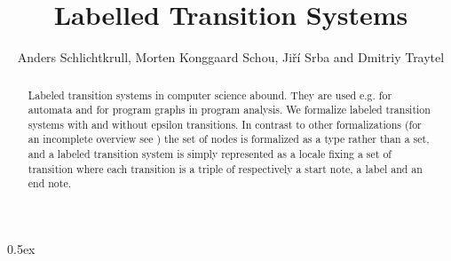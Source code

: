 \documentclass[10pt,a4paper]{article}
\begin{document}
\title{Labelled Transition Systems}
\author{Anders Schlichtkrull, Morten Konggaard Schou, Ji\v{r}\'i Srba and Dmitriy Traytel}
\date{}

\maketitle

\begin{abstract}
\noindent
Labeled transition systems in computer science abound. They are used e.g. for automata and for program graphs in program analysis.
We formalize labeled transition systems with and without epsilon transitions.
In contrast to other formalizations (for an incomplete overview see \cite{graphs}) the set of nodes is formalized as a type rather than a set,
and a labeled transition system is simply represented as a locale fixing a set of transition where each transition is a triple of respectively a start note, a label and an end note.

\end{abstract}

\tableofcontents

\newpage

\parindent 0pt
\parskip 0.5ex

\newpage





\end{document}
